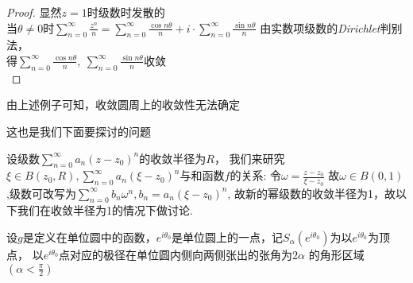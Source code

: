 \begin{proof}
    显然$z=1$时级数时发散的\\
    当$\theta\neq0$时$\displaystyle{\sum\limits_{n=0}^\infty\frac{z^n}{n}=
    \sum\limits_{n=0}^\infty\frac{\cos n\theta}{n}+i\cdot\sum\limits_{n=0}^\infty \frac{\sin n\theta}{n}}$
    由实数项级数的\emph{Dirichlet}判别法，\\
    得$\displaystyle{\sum\limits_{n=0}^\infty\frac{\cos n\theta}{n},\ \sum\limits_{n=0}^\infty \frac{\sin n\theta}{n}}$收敛\\
\end{proof}
由上述例子可知，收敛圆周上的收敛性无法确定\par 这也是我们下面要探讨的问题\par
设级数$\displaystyle{\sum\limits_{n=0}^\infty a_n(z-z_0)^n}$的收敛半径为$R$，
我们来研究$\displaystyle{\xi\in B(z_0,R),\sum\limits_{n=0}^\infty a_n(\xi-z_0)^n}$与和函数$f$的关系:
令$\displaystyle{\omega=\frac{z-z_0}{\xi-z_0}}$
故$\omega\in B(0,1)$,级数可改写为$\displaystyle{\sum\limits_{n=0}^\infty b_n\omega^n},b_n=a_n(\xi-z_0)^n$,
故新的幂级数的收敛半径为1，故以下我们在收敛半径为1的情况下做讨论.

\begin{mypro}[*]
    设$g$是定义在单位圆中的函数，$e^{i\theta_0}$是单位圆上的一点，记$S_\alpha(e^{i\theta_0})$为以$e^{i\theta_0}$为顶点，
    以$e^{i\theta_0}$点对应的极径在单位圆内侧向两侧张出的张角为$2\alpha$
    的角形区域$(\alpha<\frac{\pi}{2})$
\end{mypro}

